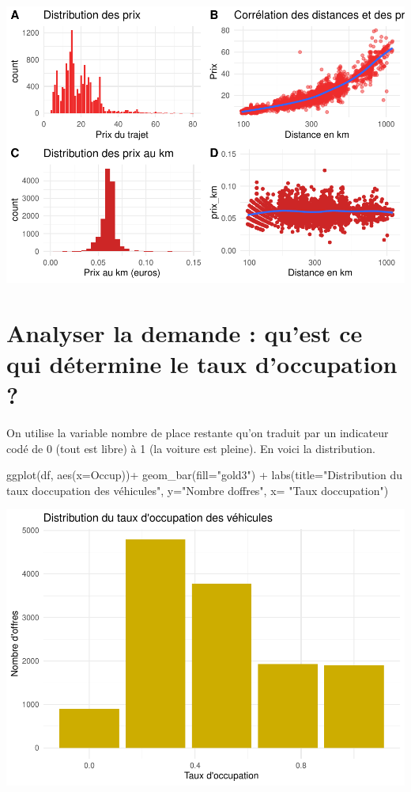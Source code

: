 \documentclass[
]{book}
\newenvironment{Shaded}{\begin{snugshade}}{\end{snugshade}}
\newcommand{\AttributeTok}[1]{\textcolor[rgb]{0.77,0.63,0.00}{#1}}
\newcommand{\FunctionTok}[1]{\textcolor[rgb]{0.00,0.00,0.00}{#1}}
\newcommand{\NormalTok}[1]{#1}
\newcommand{\SpecialCharTok}[1]{\textcolor[rgb]{0.00,0.00,0.00}{#1}}
\newcommand{\StringTok}[1]{\textcolor[rgb]{0.31,0.60,0.02}{#1}}
\begin{document}
\includegraphics{bookdown-demo_files/figure-latex/0908-1.pdf}

\hypertarget{analyser-la-demande-quest-ce-qui-duxe9termine-le-taux-doccupation}{%
\section{Analyser la demande : qu'est ce qui détermine le taux d'occupation ?}\label{analyser-la-demande-quest-ce-qui-duxe9termine-le-taux-doccupation}}

On utilise la variable nombre de place restante qu'on traduit par un indicateur codé de 0 (tout est libre) à 1 (la voiture est pleine). En voici la distribution.

\begin{Shaded}
\begin{Highlighting}[]
\FunctionTok{ggplot}\NormalTok{(df, }\FunctionTok{aes}\NormalTok{(}\AttributeTok{x=}\NormalTok{Occup))}\SpecialCharTok{+}
  \FunctionTok{geom\_bar}\NormalTok{(}\AttributeTok{fill=}\StringTok{"gold3"}\NormalTok{)  }\SpecialCharTok{+}
  \FunctionTok{labs}\NormalTok{(}\AttributeTok{title=}\StringTok{"Distribution du taux d\textquotesingle{}occupation des véhicules"}\NormalTok{, }
       \AttributeTok{y=}\StringTok{"Nombre d\textquotesingle{}offres"}\NormalTok{, }\AttributeTok{x=} \StringTok{"Taux d\textquotesingle{}occupation"}\NormalTok{)}
\end{Highlighting}
\end{Shaded}

\includegraphics{bookdown-demo_files/figure-latex/0909-1.pdf}
\end{document}
